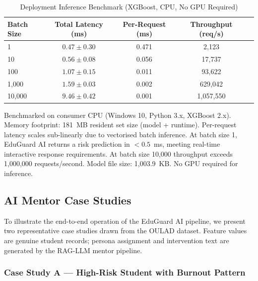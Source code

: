 \begin{table}[!t]
  \renewcommand{\arraystretch}{1.25}
  \caption{Deployment Inference Benchmark (XGBoost, CPU, No GPU Required)}
  \label{tab:deployment}
  \centering
  \begin{tabular}{lcccc}
    \hline
    \textbf{Batch Size} & \textbf{Total Latency (ms)} & \textbf{Per-Request (ms)} & \textbf{Throughput (req/s)} \\
    \hline
    1         & $0.47 \pm 0.30$  & 0.471 & 2,123    \\
    10        & $0.56 \pm 0.08$  & 0.056 & 17,737   \\
    100       & $1.07 \pm 0.15$  & 0.011 & 93,622   \\
    1,000     & $1.59 \pm 0.03$  & 0.002 & 629,042  \\
    10,000    & $9.46 \pm 0.42$  & 0.001 & 1,057,550 \\
    \hline
  \end{tabular}
  \vspace{1mm}
  \begin{flushleft}
    \small
    Benchmarked on consumer CPU (Windows 10, Python 3.x, XGBoost 2.x).
    Memory footprint: 181~MB resident set size (model + runtime).
    Per-request latency scales sub-linearly due to vectorised batch inference.
    At batch size 1, EduGuard AI returns a risk prediction in $< 0.5$~ms,
    meeting real-time interactive response requirements.
    At batch size 10,000 throughput exceeds 1,000,000 requests/second.
    Model file size: 1,003.9~KB.
    No GPU required for inference.
  \end{flushleft}
\end{table}



\subsection{AI Mentor Case Studies}
\label{sec:case_studies}

To illustrate the end-to-end operation of the EduGuard AI pipeline,
we present two representative case studies drawn from the OULAD dataset.
Feature values are genuine student records; persona assignment and
intervention text are generated by the RAG-LLM mentor pipeline.

\subsubsection{Case Study A — High-Risk Student with Burnout Pattern}

